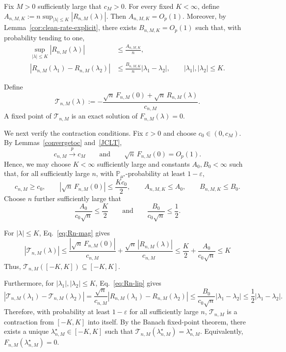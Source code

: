 \documentclass[11pt]{article}
\theoremstyle{definition}
\begin{document}
Fix $M>0$ sufficiently large that $c_M>0.$
For every fixed $K<\infty$, define $A_{n,M,K}
:=
n\sup_{|\lambda|\leq K}
|R_{n,M}(\lambda)|.$
Then $A_{n,M,K}=O_p(1).$
Moreover, by Lemma~\ref{cor:clean-rate-explicit}, there exists
$B_{n,M,K}=O_p(1)$ such that, with probability tending to one,
\begin{align}
\sup_{|\lambda|\leq K}
|R_{n,M}(\lambda)|
&\leq
\frac{A_{n,M,K}}{n},
\label{eq:Rn-mag}
\\
|R_{n,M}(\lambda_1)-R_{n,M}(\lambda_2)|
&\leq
\frac{B_{n,M,K}}{n}
|\lambda_1-\lambda_2|,
\qquad
|\lambda_1|,|\lambda_2|\leq K.
\label{eq:Rn-lip}
\end{align}

Define
\[
\mathcal T_{n,M}(\lambda)
:=
-
\frac{
\sqrt n\,F_{n,M}(0)
+
\sqrt n\,R_{n,M}(\lambda)
}{
c_{n,M}
}.
\]
A fixed point of $\mathcal T_{n,M}$ is an exact solution of $F_{n,M}(\lambda)=0.$

We next verify the contraction conditions. Fix $\varepsilon>0$ and 
choose $c_0\in(0,c_M).$
By Lemmas~\ref{convergetoc} and~\ref{JCLT},
\[
c_{n,M}\xrightarrow{p}c_M
\qquad\text{and}\qquad
\sqrt n\,F_{n,M}(0)=O_p(1).
\]
Hence, we may choose $K<\infty$ sufficiently large and constants
$A_0,B_0<\infty$ such that, for all sufficiently large $n$, with
$\mathbb P_{\mu^\star}$-probability at least $1-\varepsilon$,
\[
c_{n,M}\geq c_0,
\qquad
\left|
\sqrt n\,F_{n,M}(0)
\right|
\leq
\frac{Kc_0}{2},
\qquad
A_{n,M,K}\leq A_0,
\qquad
B_{n,M,K}\leq B_0.
\]
Choose $n$ further sufficiently large that
\[
\frac{A_0}{c_0\sqrt n}
\leq
\frac K2
\qquad\text{and}\qquad
\frac{B_0}{c_0\sqrt n}
\leq
\frac12.
\]

For $|\lambda|\leq K$, Eq.~\eqref{eq:Rn-mag} gives $$|\mathcal T_{n,M}(\lambda)| \leq \frac{
\left|
\sqrt n\,F_{n,M}(0)
\right|
}{
c_{n,M}
}
+
\frac{
\sqrt n\,|R_{n,M}(\lambda)|
}{
c_{n,M}
} \leq \frac K2
+
\frac{A_0}{c_0\sqrt n} \leq K$$
Thus, $\mathcal T_{n,M}([-K,K])
\subseteq
[-K,K].$

Furthermore, for
$|\lambda_1|,|\lambda_2|\leq K$, Eq.~\eqref{eq:Rn-lip} gives
\[
|\mathcal T_{n,M}(\lambda_1)-\mathcal T_{n,M}(\lambda_2)|
=
\frac{\sqrt n}{c_{n,M}}
|R_{n,M}(\lambda_1)-R_{n,M}(\lambda_2)|
\leq
\frac{B_0}{c_0\sqrt n}
|\lambda_1-\lambda_2|
\leq
\frac12|\lambda_1-\lambda_2|.
\]
Therefore, with probability at least $1-\varepsilon$ for all
sufficiently large $n$, $\mathcal T_{n,M}$ is a contraction from
$[-K,K]$ into itself. By the Banach fixed-point theorem, there exists
a unique $\lambda_{n,M}^\star\in[-K,K]$ such that $\mathcal T_{n,M}(\lambda_{n,M}^\star)
=
\lambda_{n,M}^\star.$
Equivalently, $F_{n,M}(\lambda_{n,M}^\star)=0.$
\end{document}
